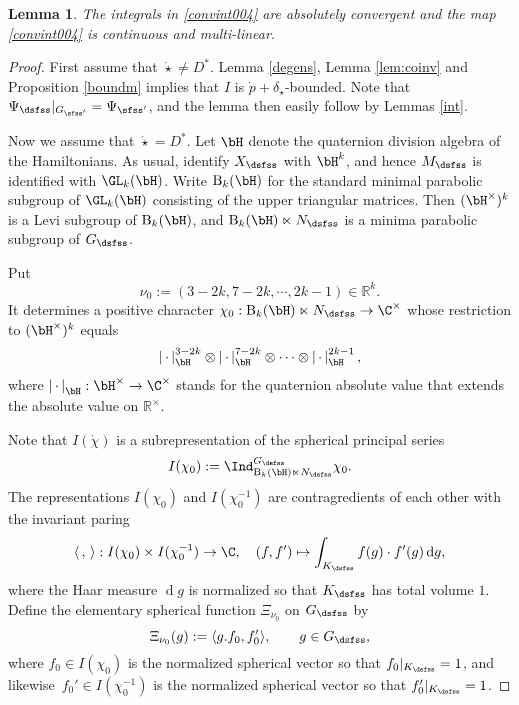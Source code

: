 \documentclass[12pt,a4paper]{amsart}
\def\abs#1{\left|{#1}\right|}
\newcommand{\od}{\operatorname{d}}
\newcommand{\R}{\mathbb R}
\newcommand{\la}{\langle}
\newcommand{\ra}{\rangle}
\numberwithin{equation}{section}
\newtheorem{lem}[thm]{Lemma}
\theoremstyle{remark}
\begin{document}
\begin{lem}\label{intpi004}
The integrals in \eqref{convint004} are absolutely convergent and the map \eqref{convint004} is   continuous and multi-linear. 
\end{lem}
\begin{proof}
 First assume that $\dot \star\neq D^*$. Lemma \ref{degens}, Lemma \ref{lem:coinv} and  Proposition \ref{boundm} implies that  $I$ is $\dot p+\delta_{\dot \star}$-bounded. 
 Note that ${\Psi_\dsfss}|_{G_{\sfss'}}=\Psi_{\sfss'}$, and the lemma then easily follow by Lemmas \ref{int}.
 
 

 Now we  assume that $\dot \star= D^*$. Let $\bH$ denote the quaternion division algebra of the Hamiltonians. As usual,  identify $X_\dsfss$ with $\bH^k$,  and hence $M_{\dsfss}$ is identified with $\GL_k(\bH)$. Write $\mathrm{B}_k(\bH)$ for the standard minimal parabolic subgroup of $\GL_k(\bH)$ consisting of the upper triangular matrices. Then $(\bH^\times)^k$ is a Levi subgroup of $\mathrm{B}_k(\bH)$, and $\mathrm{B}_k(\bH)\ltimes N_{\dsfss}$ is a minima parabolic subgroup of $G_{\dsfss}$. 

 Put 
 \[
   \nu_0:=(3-2k, 7-2k, \cdots, 2k-1)\in \R^k.
 \]
 It determines a positive character $\chi_0: \mathrm{B}_k(\bH)\ltimes N_{\dsfss}\rightarrow \C^\times $ whose restriction to $(\bH^\times)^k$ equals 
 \[
    \abs{\, \cdot\, }_\bH^{3-2k}\otimes  \abs{\, \cdot\, }_\bH^{7-2k}\otimes \cdots \otimes  \abs{\, \cdot\, }_\bH^{2k-1},
 \]
 where  $\abs{\, \cdot\, }_\bH: \bH^\times \rightarrow \C^\times $ stands for the quaternion absolute value that extends the absolute value on $\R^\times $. 
 
 Note that $I(\dot{\chi})$ is a subrepresentation of the spherical principal series 
 \[
  I(\chi_0):= \Ind_{\mathrm{B}_k(\bH)\ltimes N_{\dsfss}}^{G_{\dsfss}} \chi_0. 
 \]
 The representations 
 $I(\chi_0)$ and $I(\chi_0^{-1})$ are contragredients of each other with the invariant paring
 \[
  \la\,,\,\ra:  I(\chi_0)\times I(\chi_0^{-1})\rightarrow \C, \quad (f, f')\mapsto \int_{K_\dsfss} f(g) \cdot f'(g) \od\!g,
 \]
 where the Haar measure $\od\!g$ is normalized so that $K_\dsfss$ has total volume $1$.  Define the elementary spherical function $ \Xi_{\nu_0}$ on $G_\dsfss$ by
 \[
    \Xi_{\nu_0}(g):=\la g.f_0, f_0'\ra,\qquad g\in G_\dsfss,
    \]
 where $f_0\in I(\chi_0)$ is the normalized spherical vector so that ${f_0}|_{K_\dsfss}=1$, and likewise $\, f_0'\in I(\chi_0^{-1})$ is the normalized spherical vector so that  ${f_0'}|_{K_\dsfss}=1$.
 

\end{proof}
\end{document}
